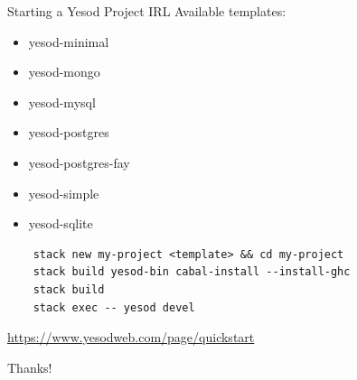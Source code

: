 \documentclass[pdf]{beamer}
\begin{document}
\begin{frame}[fragile]{Starting a Yesod Project IRL}
  Available templates:
  \begin{itemize}
  \item yesod-minimal
  \item yesod-mongo
  \item yesod-mysql
  \item yesod-postgres
  \item yesod-postgres-fay
  \item yesod-simple
  \item yesod-sqlite
  \end{itemize}
  \begin{verbatim}
    stack new my-project <template> && cd my-project
    stack build yesod-bin cabal-install --install-ghc
    stack build
    stack exec -- yesod devel
  \end{verbatim}
  \url{https://www.yesodweb.com/page/quickstart}
\end{frame}

\begin{frame}{Thanks!}
  
\end{frame}
\end{document}
